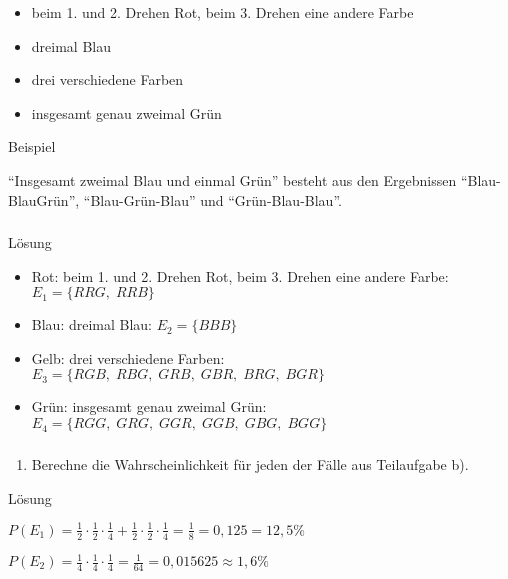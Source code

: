 \documentclass[
  ngerman,
]{book}
\providecommand{\tightlist}{%
  \setlength{\itemsep}{0pt}\setlength{\parskip}{0pt}}
\begin{document}
\begin{itemize}
\tightlist
\item
  beim 1. und 2. Drehen Rot, beim 3. Drehen eine andere Farbe
\item
  dreimal Blau
\item
  drei verschiedene Farben
\item
  insgesamt genau zweimal Grün
\end{itemize}

Beispiel

``Insgesamt zweimal Blau und einmal Grün'' besteht aus den Ergebnissen ``Blau-BlauGrün'', ``Blau-Grün-Blau'' und ``Grün-Blau-Blau''.

\hypertarget{section-126}{%
\subsubsection*{}\label{section-126}}

Lösung

\begin{itemize}
\tightlist
\item
  Rot: beim 1. und 2. Drehen Rot, beim 3. Drehen eine andere Farbe: \(E_1=\{RRG,\;RRB\}\)
\item
  Blau: dreimal Blau: \(E_2=\{BBB\}\)
\item
  Gelb: drei verschiedene Farben: \(E_3=\{RGB,\; RBG,\;GRB,\;GBR,\;BRG,\;BGR\}\)
\item
  Grün: insgesamt genau zweimal Grün: \(E_4=\{RGG,\; GRG,\;GGR,\;GGB,\;GBG,\;BGG\}\)
\end{itemize}

\hypertarget{section-127}{%
\subsubsection*{}\label{section-127}}

\begin{enumerate}
\def\labelenumi{\alph{enumi})}
\setcounter{enumi}{2}
\tightlist
\item
  Berechne die Wahrscheinlichkeit für jeden der Fälle aus Teilaufgabe b).
\end{enumerate}

Lösung

\(P(E_1)= \frac{1}{2}\cdot\frac{1}{2}\cdot\frac{1}{4}+\frac{1}{2}\cdot\frac{1}{2}\cdot\frac{1}{4}=\frac{1}{8}=0,125=12,5\%\)

\(P(E_2)=\frac{1}{4}\cdot\frac{1}{4}\cdot\frac{1}{4}=\frac{1}{64}=0,015625\approx 1,6\%\)
\end{document}
